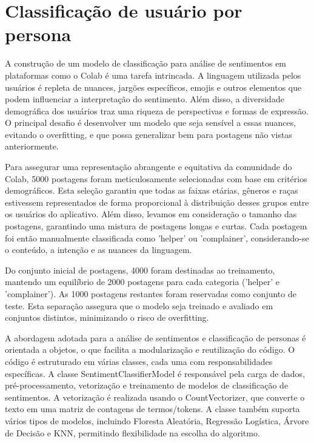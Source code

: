 \section{Classificação de usuário por persona}

A construção de um modelo de classificação para análise de sentimentos em plataformas como o Colab é uma tarefa intrincada. A linguagem utilizada pelos usuários é repleta de nuances, jargões específicos, emojis e outros elementos que podem influenciar a interpretação do sentimento. Além disso, a diversidade demográfica dos usuários traz uma riqueza de perspectivas e formas de expressão. O principal desafio é desenvolver um modelo que seja sensível a essas nuances, evitando o overfitting, e que possa generalizar bem para postagens não vistas anteriormente.

Para assegurar uma representação abrangente e equitativa da comunidade do Colab, 5000 postagens foram meticulosamente selecionadas com base em critérios demográficos. Esta seleção garantiu que todas as faixas etárias, gêneros e raças estivessem representados de forma proporcional à distribuição desses grupos entre os usuários do aplicativo. Além disso, levamos em consideração o tamanho das postagens, garantindo uma mistura de postagens longas e curtas. Cada postagem foi então manualmente classificada como 'helper' ou 'complainer', considerando-se o conteúdo, a intenção e as nuances da linguagem.

Do conjunto inicial de postagens, 4000 foram destinadas ao treinamento, mantendo um equilíbrio de 2000 postagens para cada categoria ('helper' e 'complainer'). As 1000 postagens restantes foram reservadas como conjunto de teste. Esta separação assegura que o modelo seja treinado e avaliado em conjuntos distintos, minimizando o risco de overfitting.

A abordagem adotada para a análise de sentimentos e classificação de personas é orientada a objetos, o que facilita a modularização e reutilização do código. O código é estruturado em várias classes, cada uma com responsabilidades específicas. A classe SentimentClassifierModel é responsável pela carga de dados, pré-processamento, vetorização e treinamento de modelos de classificação de sentimentos. A vetorização é realizada usando o CountVectorizer, que converte o texto em uma matriz de contagens de termos/tokens. A classe também suporta vários tipos de modelos, incluindo Floresta Aleatória, Regressão Logística, Árvore de Decisão e KNN, permitindo flexibilidade na escolha do algoritmo.

